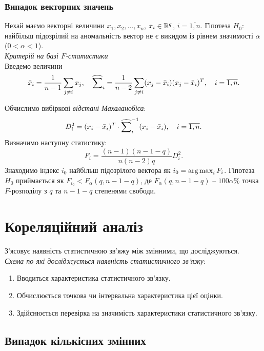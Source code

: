 \subsubsection{Випадок векторних значень}

Нехай маємо векторні величини $x_1, x_2, \ldots, x_n$, $x_i \in \mathbb{R}^q$, $i = \overline{1, n}$. Гіпотеза $H_0$: найбільш підозрілий на аномальність вектор не є викидом із рівнем значимості $\alpha$ ($0 < \alpha < 1$). \\

\textit{Критерій на базі $F$-статистики} \\

Введемо величини \[\bar{x}_i = \dfrac{1}{n - 1} \displaystyle\sum\limits_{j \ne i} x_j, \quad \widehat{\displaystyle\sum\limits}_i = \dfrac{1}{n - 2} \displaystyle\sum\limits_{j \ne i} (x_j - \bar{x}_i) (x_j - \bar{x}_i)^T, \quad i = \overline{1,n}.\] 

Обчислимо вибіркові \textit{відстані Махаланобіса}: \[ D_i^2 = (x_i - \bar{x}_i)^T \cdot \widehat{\displaystyle\sum\limits}_i^{-1} (x_i - \bar{x}_i), \quad i = \overline{1, n}. \] Визначимо наступну статистику: \[ F_i = \dfrac{(n - 1)(n - 1 - q)}{n(n - 2)q} D_i^2. \] Знаходимо індекс $i_0$ найбільш підозрілого вектора як $i_0 = \operatorname*{arg\,max}_i F_i$. Гіпотеза $H_0$ приймається як $F_{i_0} < F_\alpha(q, n - 1 - q)$, де $F_\alpha(q, n - 1 - q)$ -- $100\alpha\%$ точка $F$-розподілу з $q$ та $n - 1 - q$ степенями свободи.

\section{Кореляційний аналіз}

З'ясовує наявність статистичною зв'яжу між змінними, що досліджуються. \\

\textit{Схема по які досліджується наявність статистичного зв'язку}:
\begin{enumerate}
	\item Вводиться характеристика статистичного зв'язку.
	\item Обчислюється точкова чи інтервальна характеристика цієї оцінки.
	\item Здійснюється перевірка на значимість характеристики статистичного зв'язку.
\end{enumerate}

\subsection{Випадок кількісних змінних}

